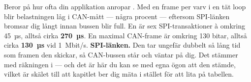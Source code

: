  Beror på hur ofta din applikation anropar . Med en frame per varv i en tät
loop blir belastningen låg i CAN-mått --- några procent --- eftersom SPI-länken bromsar dig långt
innan bussen blir full.
 En  är sex SPI-transaktioner à omkring 45~µs, alltså cirka \textbf{270~µs}.
En maximal CAN-frame är omkring 130 bitar, alltså cirka \textbf{130~µs} vid 1~Mbit/s.
 \textbf{SPI-länken.} Den tar ungefär dubbelt så lång tid som framen den skickar, så
CAN-bussen står och väntar på dig. Det stämmer med räkningen i  --- och det
är här du kan se med egna ögon att den stämde, vilket är skälet till att kapitlet ber dig mäta
i stället för att lita på tabellen.
